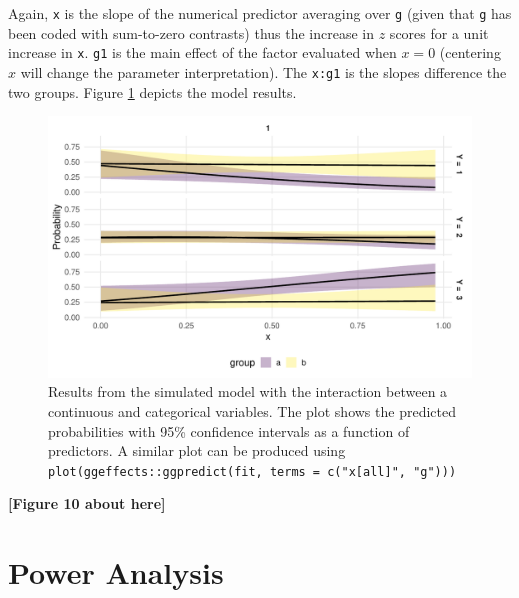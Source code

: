 \documentclass[
  man, mask,floatsintext]{apa6}
\begin{document}
\normalsize

Again, \texttt{x} is the slope of the numerical predictor averaging over \texttt{g} (given that \texttt{g} has been coded with sum-to-zero contrasts) thus the increase in \(z\) scores for a unit increase in \texttt{x}. \texttt{g1} is the main effect of the factor evaluated when \(x = 0\) (centering \(x\) will change the parameter interpretation). The \texttt{x:g1} is the slopes difference the two groups. Figure \ref{fig:fig-effects-num-by-cat-interaction} depicts the model results.

\scriptsize

\begin{figure}

{\centering \includegraphics[width=1\linewidth]{paper_files/figure-latex/fig-effects-num-by-cat-interaction-1} 

}

\caption{Results from the simulated model with the interaction between a continuous and categorical variables. The plot shows the predicted probabilities with 95\% confidence intervals as a function of predictors. A similar plot can be produced using \texttt{plot(ggeffects::ggpredict(fit,\ terms\ =\ c("x{[}all{]}",\ "g")))}}\label{fig:fig-effects-num-by-cat-interaction}
\end{figure}

\begin{center}\textbf{[Figure 10 about here]} \end{center}

\normalsize

\section{Power Analysis}\label{power-analysis}
\end{document}
